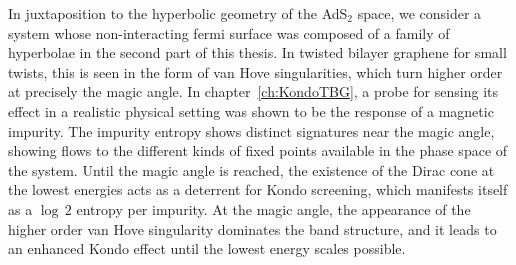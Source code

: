 \par
In juxtaposition to the hyperbolic geometry of the AdS${}_2$ space, we consider a system whose non-interacting fermi surface was composed of a family of hyperbolae in the second part of this thesis. In twisted bilayer graphene for small twists, this is seen in the form of van Hove singularities, which turn higher order at precisely the magic angle. In chapter~\ref{ch:KondoTBG}, a probe for sensing its effect in a realistic physical setting was shown to be the response of a magnetic impurity. The impurity entropy shows distinct signatures near the magic angle, showing flows to the different kinds of fixed points available in the phase space of the system. Until the magic angle is reached, the existence of the Dirac cone at the lowest energies acts as a deterrent for Kondo screening, which manifests itself as a $\log \, 2$ entropy per impurity. At the magic angle, the appearance of the higher order van Hove singularity dominates the band structure, and it leads to an enhanced Kondo effect until the lowest energy scales possible.


\newpage
\thispagestyle{empty}